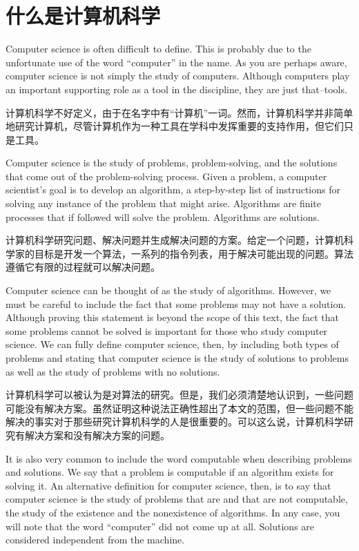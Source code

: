 \section{什么是计算机科学}

Computer science is often difficult to define. This is probably due to the unfortunate use of the word “computer” in the name. As you are perhaps aware, computer science is not simply the study of computers. Although computers play an important supporting role as a tool in the discipline, they are just that–tools.

计算机科学不好定义，由于在名字中有“计算机”一词。然而，计算机科学并非简单地研究计算机，尽管计算机作为一种工具在学科中发挥重要的支持作用，但它们只是工具。

Computer science is the study of problems, problem-solving, and the solutions that come out of the problem-solving process. Given a problem, a computer scientist’s goal is to develop an algorithm, a step-by-step list of instructions for solving any instance of the problem that might arise. Algorithms are finite processes that if followed will solve the problem. Algorithms are solutions.

计算机科学研究问题、解决问题并生成解决问题的方案。给定一个问题，计算机科学家的目标是开发一个算法，一系列的指令列表，用于解决可能出现的问题。算法遵循它有限的过程就可以解决问题。

Computer science can be thought of as the study of algorithms. However, we must be careful to include the fact that some problems may not have a solution. Although proving this statement is beyond the scope of this text, the fact that some problems cannot be solved is important for those who study computer science. We can fully define computer science, then, by including both types of problems and stating that computer science is the study of solutions to problems as well as the study of problems with no solutions.

计算机科学可以被认为是对算法的研究。但是，我们必须清楚地认识到，一些问题可能没有解决方案。虽然证明这种说法正确性超出了本文的范围，但一些问题不能解决的事实对于那些研究计算机科学的人是很重要的。可以这么说，计算机科学研究有解决方案和没有解决方案的问题。

It is also very common to include the word computable when describing problems and solutions. We say that a problem is computable if an algorithm exists for solving it. An alternative definition for computer science, then, is to say that computer science is the study of problems that are and that are not computable, the study of the existence and the nonexistence of algorithms. In any case, you will note that the word “computer” did not come up at all. Solutions are considered independent from the machine.

